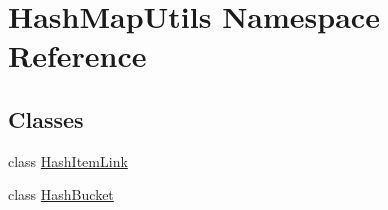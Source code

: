 \hypertarget{namespace_hash_map_utils}{\section{Hash\-Map\-Utils Namespace Reference}
\label{namespace_hash_map_utils}
}
\subsection*{Classes}
\begin{DoxyCompactItemize}
\item 
class \hyperlink{class_hash_map_utils_1_1_hash_item_link}{Hash\-Item\-Link}
\item 
class \hyperlink{class_hash_map_utils_1_1_hash_bucket}{Hash\-Bucket}
\end{DoxyCompactItemize}

